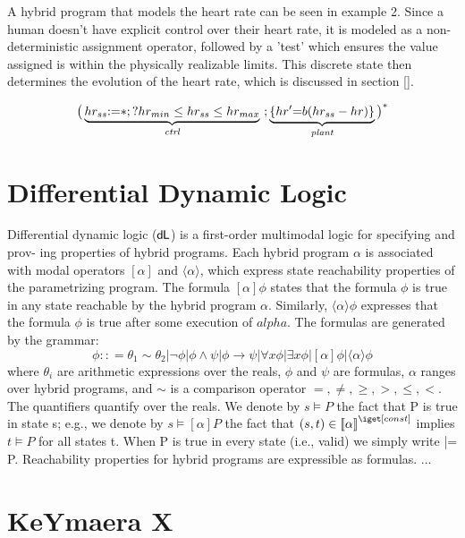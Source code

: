 \documentclass[sigconf,screen]{acmart}
\begin{document}
A hybrid program that models the heart rate can be seen in example 2. Since a human doesn't have explicit control over their heart rate, it is modeled as a non-deterministic assignment operator, followed by a 'test' which ensures the value assigned is within the physically realizable limits. This discrete state then determines the evolution of the heart rate, which is discussed in section [].

\begin{example}
\label{ex:simpleHR}
\[
    {
      \big(\underbrace{hr_{ss}{:=}*;?hr_{min}\leq hr_{ss}\leq hr_{max}}_{\textit{ctrl}}\ ;
      \underbrace{\{hr'{=}b(hr_{ss}-hr)\}}_{\textit{plant}}\big)
    }^{*}
\]
\end{example}


\section{Differential Dynamic Logic}
Differential dynamic logic ($\text{\upshape\textsf{d{\kern-0.05em}L}}$) is a first-order multimodal logic for specifying and prov- ing properties of hybrid programs. Each hybrid program $\alpha$ is associated with modal operators $[\alpha]$ and $\langle \alpha \rangle$, which express state reachability properties of the parametrizing program. The formula $[\alpha]\phi$ states that the formula $\phi$ is true in any state reachable by the hybrid program $\alpha$. Similarly, $\langle \alpha \rangle \phi$ expresses that the formula $\phi$ is true after some execution of $alpha$. The \dDL formulas are generated by the grammar:
$$ \phi :: = \theta_1 \sim \theta_2 | \neg \phi | \phi \wedge \psi | \phi \rightarrow \psi | \forall x \phi | \exists x \phi | [\alpha]\phi | \langle \alpha \rangle \phi  $$
where $\theta_i$ are arithmetic expressions over the reals, $\phi$ and $\psi$ are formulas, $\alpha$ ranges over hybrid programs, and $\sim$ is a comparison operator $=,\neq, \geq, >,\leq, <$. The quantifiers quantify over the reals. We denote by $s \models P$ the fact that P is true in state s; e.g., we denote by $s \models [\alpha]P$ the fact that $(s, t) \in \imodel[]{}{\alpha}$ implies $t \models P$ for all states t. When P is true in every state (i.e., valid) we simply write |= P.
Reachability properties for hybrid programs are expressible as \dDL formulas. ... 


\section{KeYmaera X}
\end{document}
